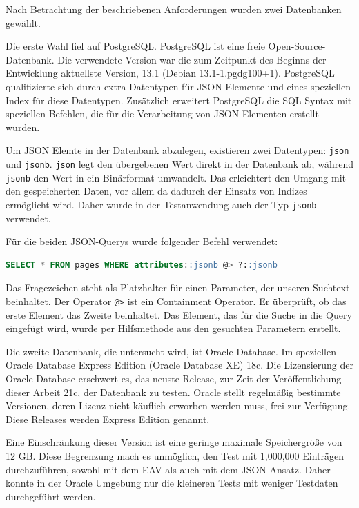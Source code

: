 
Nach Betrachtung der beschriebenen Anforderungen wurden zwei Datenbanken gewählt.

Die erste Wahl fiel auf PostgreSQL. PostgreSQL ist eine freie Open-Source-Datenbank. Die verwendete Version war die zum Zeitpunkt des Beginns der Entwicklung aktuellste Version, 13.1 (Debian 13.1-1.pgdg100+1). PostgreSQL qualifizierte sich durch extra Datentypen für JSON Elemente und eines speziellen Index für diese Datentypen. Zusätzlich erweitert PostgreSQL die SQL Syntax mit speziellen Befehlen, die für die Verarbeitung von JSON Elementen erstellt wurden.

Um JSON Elemte in der Datenbank abzulegen, existieren zwei Datentypen: \lstinline|json| und \lstinline|jsonb|. \lstinline|json| legt den übergebenen Wert direkt in der Datenbank ab, während \lstinline|jsonb| den Wert in ein Binärformat umwandelt. Das  erleichtert den Umgang mit den gespeicherten Daten, vor allem da dadurch der Einsatz von Indizes ermöglicht wird. Daher wurde in der Testanwendung auch der Typ \lstinline|jsonb| verwendet.


Für die beiden JSON-Querys wurde folgender Befehl verwendet:
\begin{lstlisting}[language=SQL, caption={PostgreSQL Querys}]
SELECT * FROM pages WHERE attributes::jsonb @> ?::jsonb
\end{lstlisting}
Das Fragezeichen steht als Platzhalter für einen Parameter, der unseren Suchtext beinhaltet. Der Operator \lstinline|@>| ist ein Containment Operator. Er überprüft, ob das erste Element das Zweite beinhaltet. Das Element, das für die Suche in die Query eingefügt wird, wurde per Hilfsmethode aus den gesuchten Parametern erstellt.  \cite{PostgreSQLDocumentation.2021}

Die zweite Datenbank, die untersucht wird, ist Oracle Database. Im speziellen Oracle Database Express Edition (Oracle Database XE) 18c. Die Lizensierung der Oracle Database erschwert es, das neuste Release, zur Zeit der Veröffentlichung dieser Arbeit 21c, der Datenbank zu testen. Oracle stellt regelmäßig bestimmte Versionen, deren Lizenz nicht käuflich erworben werden muss, frei zur Verfügung. Diese Releases werden Express Edition genannt. 

Eine Einschränkung dieser Version ist eine geringe maximale Speichergröße von 12 GB. Diese Begrenzung mach es unmöglich, den Test mit 1,000,000 Einträgen durchzuführen, sowohl mit dem EAV als auch mit dem JSON Ansatz. Daher konnte in der Oracle Umgebung nur die kleineren Tests mit weniger Testdaten durchgeführt werden. \cite{oraclexe.13.07.2021}

